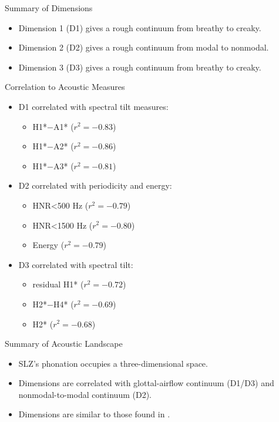 \documentclass{beamer}
\begin{document}
\begin{frame}{Summary of Dimensions}
  \begin{itemize}
    \item Dimension 1 (D1) gives a rough continuum from breathy to creaky.
    \item Dimension 2 (D2) gives a rough continuum from modal to nonmodal.
    \item Dimension 3 (D3) gives a rough continuum from breathy to creaky.
  \end{itemize}
\end{frame}

\begin{frame}{Correlation to Acoustic Measures}
  \begin{itemize}
    \item D1 correlated with spectral tilt measures: 
    \begin{itemize}
      \item H1*$-$A1* ($r^2 = -0.83$) 
      \item H1*$-$A2* ($r^2 = -0.86$)
      \item H1*$-$A3* ($r^2 = -0.81$)
    \end{itemize}
    \item D2 correlated with periodicity and energy: 
    \begin{itemize}
      \item HNR\textless 500 Hz ($r^2 = -0.79$)
      \item HNR\textless 1500 Hz ($r^2 = -0.80$)
      \item Energy ($r^2 = -0.79$)
    \end{itemize}
    \item D3 correlated with spectral tilt:
    \begin{itemize}
      \item residual H1* ($r^2 = -0.72$)
      \item H2*$-$H4* ($r^2 = -0.69$)
      \item H2* ($r^2 = -0.68$)
    \end{itemize}
  \end{itemize}
\end{frame}

\begin{frame}{Summary of Acoustic Landscape}
  \begin{itemize}
    \item SLZ's phonation occupies a three-dimensional space.
    \item Dimensions are correlated with glottal-airflow continuum (D1/D3) and nonmodal-to-modal continuum (D2).
    \item Dimensions are similar to those found in \citet{keatingCrosslanguageAcousticSpace2023}.
  \end{itemize}
\end{frame}
\end{document}
